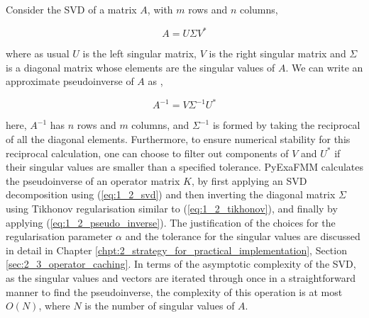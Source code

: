 Consider the SVD of a matrix $A$, with $m$ rows and $n$ columns,

\begin{equation}
    A = U \Sigma V^*
    \label{eq:1_2_svd}
\end{equation}

where as usual $U$ is the left singular matrix, $V$ is the right singular matrix
and $\Sigma$ is a diagonal matrix whose elements are the singular values of $A$.
We can write an approximate pseudoinverse of $A$ as \cite{Trefethen:1997:SIAM},

\begin{equation}
    A^{-1} = V \Sigma^{-1} U^*
    \label{eq:1_2_pseudo_inverse}
\end{equation}

here, $A^{-1}$ has $n$ rows and $m$ columns, and $\Sigma^{-1}$ is formed
by taking the reciprocal of all the diagonal elements. Furthermore, to ensure
numerical stability for this reciprocal calculation, one can choose to filter
out components of $V$ and $U^*$ if their singular values are smaller than a specified
tolerance. \gls{PyExaFMM} calculates the pseudoinverse of an operator matrix $K$,
by first applying an \gls{SVD} decomposition using (\ref{eq:1_2_svd}) and then
inverting the diagonal matrix $\Sigma$ using Tikhonov regularisation
similar to (\ref{eq:1_2_tikhonov}), and finally by applying (\ref{eq:1_2_pseudo_inverse}).
The justification of the choices for the regularisation parameter
$\alpha$ and the tolerance for the singular values are discussed in detail in
Chapter \ref{chpt:2_strategy_for_practical_implementation},
Section \ref{sec:2_3_operator_caching}. In terms of the asymptotic complexity of the \gls{SVD},
as the singular values and vectors are iterated through once in a straightforward
manner to find the pseudoinverse, the complexity of this operation is at most $O(N)$,
where $N$ is the number of singular values of $A$.

